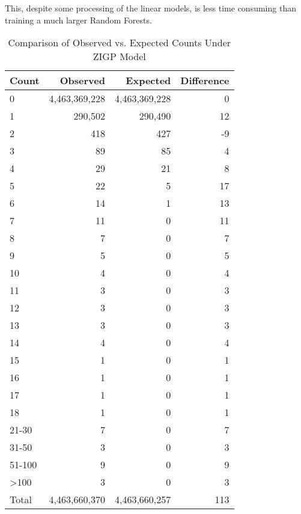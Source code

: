 \documentclass[preprint,12pt,3p]{elsarticle}
\begin{document}
This, despite some processing of the linear models, is less time consuming than training a much larger Random Forests.


\begin{table}[htbp]
\centering
\caption{Comparison of Observed vs. Expected Counts Under ZIGP Model}
\label{tab:expected_vs_observed}
\begin{tabular}{lrrr}
\hline
Count  & Observed      & Expected      & Difference  \\
\hline
0      & 4,463,369,228 & 4,463,369,228 & 0    \\
1      & 290,502       & 290,490       & 12   \\
2      & 418           & 427           & -9   \\
3      & 89            & 85            & 4    \\
4      & 29            & 21            & 8    \\
5      & 22            & 5             & 17   \\
6      & 14            & 1             & 13  \\
7      & 11            & 0             & 11   \\
8      & 7             & 0             & 7    \\
9      & 5             & 0             & 5    \\
10     & 4             & 0             & 4    \\
11     & 3             & 0             & 3    \\
12     & 3             & 0             & 3    \\
13     & 3             & 0             & 3    \\
14     & 4             & 0             & 4    \\
15     & 1             & 0             & 1    \\
16     & 1             & 0             & 1    \\
17     & 1             & 0             & 1    \\
18     & 1             & 0             & 1    \\
21-30  & 7             & 0             & 7    \\
31-50  & 3             & 0             & 3    \\
51-100 & 9             & 0             & 9    \\
>100   & 3             & 0             & 3    \\
\hline
Total  & 4,463,660,370 & 4,463,660,257 & 113 \\
\hline
\end{tabular}
\end{table}
\end{document}
